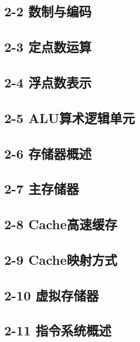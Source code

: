 \documentclass[10pt, aspectratio=169]{beamer}
\begin{document}
\subsection{2-2 数制与编码}


\subsection{2-3 定点数运算}


\subsection{2-4 浮点数表示}


\subsection{2-5 ALU算术逻辑单元}


\subsection{2-6 存储器概述}


\subsection{2-7 主存储器}


\subsection{2-8 Cache高速缓存}


\subsection{2-9 Cache映射方式}


\subsection{2-10 虚拟存储器}


\subsection{2-11 指令系统概述}

\end{document}
